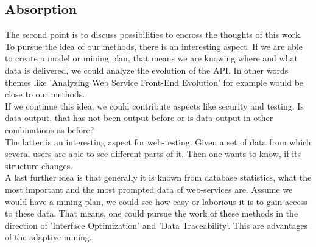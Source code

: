 \subsection{Absorption}
The second point is to discuss possibilities to encross the thoughts of this work.
To pursue the idea of our methods, there is an interesting aspect. If we are able to create a model or mining plan, that means we are knowing where and what data is delivered, we could analyze the evolution of the API. In other words themes like 'Analyzing Web Service Front-End Evolution' for example would be close to our methods. \\
If we continue this idea, we could contribute aspects like security and testing. Is data output, that has not been output before or is data output in other combinations as before? \\ The latter is an interesting aspect for web-testing. Given a set of data from which several users are able to see different parts of it. Then one wants to know, if its structure changes. \\ A last further idea is that generally it is known from database statistics, what the most important and the most prompted data of web-services are. Assume we would have a mining plan, we could see how easy or laborious it is to gain access to these data. That means, one could pursue the work of these methods in the direction of 'Interface Optimization' and 'Data Traceability'. This are advantages of the adaptive mining.

